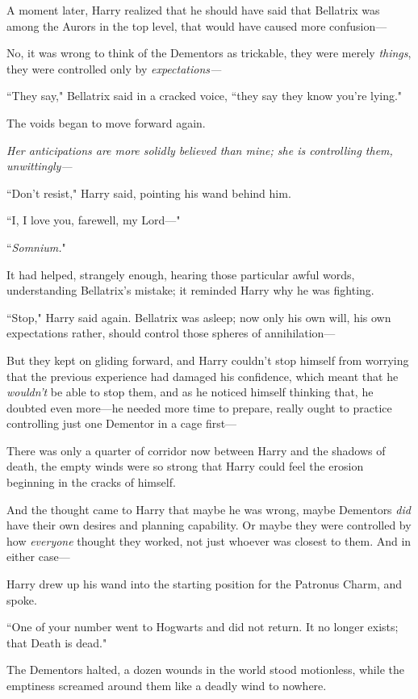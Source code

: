 A moment later, Harry realized that he should have said that Bellatrix was among the Aurors in the top level, that would have caused more confusion---

No, it was wrong to think of the Dementors as trickable, they were merely \emph{things}, they were controlled only by \emph{expectations---}

``They say," Bellatrix said in a cracked voice, ``they say they know you're lying."

The voids began to move forward again.

\emph{Her anticipations are more solidly believed than mine; she is controlling them, unwittingly---}

``Don't resist," Harry said, pointing his wand behind him.

``I, I love you, farewell, my Lord---"

``\emph{Somnium.}"

It had helped, strangely enough, hearing those particular awful words, understanding Bellatrix's mistake; it reminded Harry why he was fighting.

``Stop," Harry said again. Bellatrix was asleep; now only his own will, his own expectations rather, should control those spheres of annihilation---

But they kept on gliding forward, and Harry couldn't stop himself from worrying that the previous experience had damaged his confidence, which meant that he \emph{wouldn't} be able to stop them, and as he noticed himself thinking that, he doubted even more---he needed more time to prepare, really ought to practice controlling just one Dementor in a cage first---

There was only a quarter of corridor now between Harry and the shadows of death, the empty winds were so strong that Harry could feel the erosion beginning in the cracks of himself.

And the thought came to Harry that maybe he was wrong, maybe Dementors \emph{did} have their own desires and planning capability. Or maybe they were controlled by how \emph{everyone} thought they worked, not just whoever was closest to them. And in either case---

Harry drew up his wand into the starting position for the Patronus Charm, and spoke.

``One of your number went to Hogwarts and did not return. It no longer exists; that Death is dead."

The Dementors halted, a dozen wounds in the world stood motionless, while the emptiness screamed around them like a deadly wind to nowhere.

